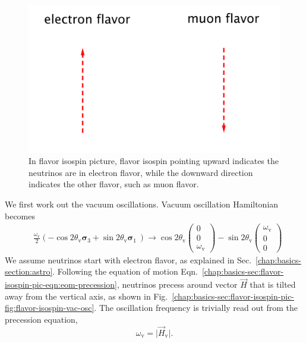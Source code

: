 \begin{figure}
    \centering
    \vspace*{-10pt}
    \includegraphics[width=\textwidth]{chapters/assets/basics/flavor-isospin-illus}
    \caption{In flavor isospin picture, flavor isospin pointing upward indicates the neutrinos are in electron flavor, while the downward direction indicates the other flavor, such as muon flavor.}
    \label{chap:basics-sec:flavor-isospin-pic-fig:flavor-isospin-illus}
\end{figure}

We first work out the vacuum oscillations. Vacuum oscillation Hamiltonian becomes
\begin{align*}
&\frac{\omega_{\mathrm v} }{2}\left( - \cos 2\theta_{\mathrm v } \boldsymbol{\sigma}_3  + \sin 2\theta_{\mathrm{v}} \boldsymbol{\sigma}_1\ \right)
\to  \cos 2\theta_{\mathrm v}\begin{pmatrix}
0\\
0\\
\omega_{\mathrm v}
\end{pmatrix} -\sin 2\theta_{\mathrm v}\begin{pmatrix}
\omega_{\mathrm v}\\
0\\
0
\end{pmatrix}
\end{align*}
We assume neutrinos start with electron flavor, as explained in Sec.~\ref{chap:basics-section:astro}. Following the equation of motion Eqn.~\ref{chap:basics-sec:flavor-isospin-pic-eqn:eom-precession}, neutrinos precess around vector $\vec H$ that is tilted away from the vertical axis, as shown in Fig.~\ref{chap:basics-sec:flavor-isospin-pic-fig:flavor-isospin-vac-osc}. The oscillation frequency is trivially read out from the precession equation,
\begin{equation*}
    \omega_{\mathrm v} = \lvert \vec H_{\mathrm v} \rvert.
\end{equation*}


